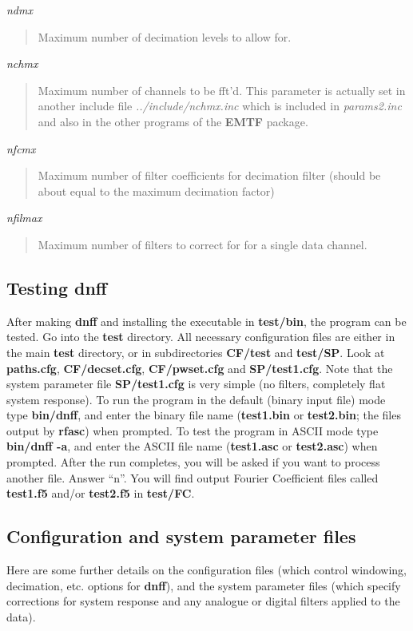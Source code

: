 {\it ndmx}
\begin{quote}
Maximum number of decimation levels to allow for.
\end{quote}
{\it nchmx}
\begin{quote}
Maximum number of channels to be fft'd. This parameter is actually set in
another include file {\it ../include/nchmx.inc} which is included in
{\it params2.inc} and also in the other programs of the {\bf EMTF} package.
\end{quote}
{\it nfcmx}
\begin{quote}
Maximum number of filter coefficients for
decimation filter (should be about equal
to the maximum decimation factor)
\end{quote}
{\it  nfilmax}
\begin{quote}
Maximum number of filters to correct for for a single data channel.
\end{quote}

\subsection{Testing dnff}

After making {\bf dnff} and installing the executable in {\bf test/bin},
the program can be tested.  Go into the {\bf test} directory.  All
necessary configuration files are either in the main {\bf test}
directory, or in subdirectories {\bf CF/test}
and {\bf test/SP}.  Look at {\bf paths.cfg}, {\bf CF/decset.cfg},
{\bf CF/pwset.cfg} and {\bf SP/test1.cfg}.  Note that the system parameter
file {\bf SP/test1.cfg} is very simple (no filters, completely flat system
response).  To run the program in the default (binary input file) mode type
{\bf bin/dnff}, and enter the binary file name ({\bf test1.bin} or 
{\bf test2.bin}; the files output by {\bf rfasc}) when prompted.
To test the program in ASCII mode
type {\bf bin/dnff -a}, and enter the ASCII file name
({\bf test1.asc} or {\bf test2.asc}) when prompted.
After the run completes, you will be asked
if you want to process another file.
Answer ``n''.  You will find output Fourier Coefficient files called
{\bf test1.f5} and/or {\bf test2.f5} in {\bf test/FC}.

\subsection{Configuration and system parameter files}

Here are some further details on the configuration files
(which control windowing, decimation, etc. options for {\bf dnff}),
and the system parameter files (which specify corrections for system
response and any analogue or digital filters applied to the data).

